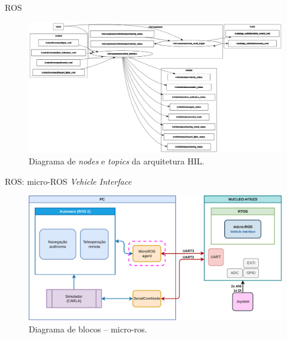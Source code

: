 \documentclass{if-beamer}
\begin{document}
\begin{frame}{ROS}

\begin{figure}[H]
	\centering
	\includegraphics[width=0.95\linewidth]{rosgraph_2}
	\caption{Diagrama de \textit{nodes} e \textit{topics} da arquitetura HIL.}
	\label{fig:rosgraph_2}
\end{figure}

\end{frame}

\begin{frame}{ROS: micro-ROS \textit{Vehicle Interface} }
	
\begin{figure}[H]
	\centering
	\includegraphics[width=0.9\linewidth]{micro_ros_nodes_scope}
	\caption{Diagrama de blocos -- micro-ros.}
	\label{fig:micro_ros_nodes_scope}
\end{figure}	
	
\end{frame}
\end{document}
